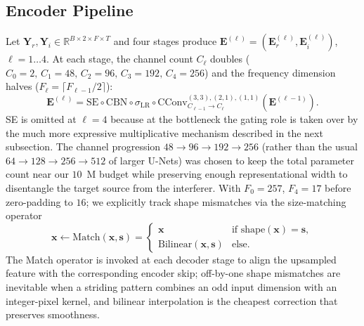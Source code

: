 \documentclass[journal,10pt]{IEEEtran}
\newcommand{\R}{\mathbb{R}}
\newcommand{\bx}{\mathbf{x}}
\newcommand{\bY}{\mathbf{Y}}
\newcommand{\bE}{\mathbf{E}}
\newcommand{\bs}{\mathbf{s}}
\begin{document}
\subsection{Encoder Pipeline}
Let \(\bY_r,\bY_i\!\in\!\R^{B\times 2\times F\times T}\) and four stages produce \(\bE^{(\ell)}=(\bE^{(\ell)}_r,\bE^{(\ell)}_i)\), \(\ell=1\!\dots\!4\). At each stage, the channel count \(C_\ell\) doubles (\(C_0\!=\!2,\,C_1\!=\!48,\,C_2\!=\!96,\,C_3\!=\!192,\,C_4\!=\!256\)) and the frequency dimension halves (\(F_\ell=\lceil F_{\ell-1}/2\rceil\)):
\begin{equation}
\bE^{(\ell)}=\mathrm{SE}\!\circ\!\mathrm{CBN}\!\circ\!\sigma_{\mathrm{LR}}\!\circ\!\mathrm{CConv}_{C_{\ell-1}\to C_\ell}^{(3,3),(2,1),(1,1)}(\bE^{(\ell-1)}).
\label{eq:encstage}
\end{equation}
SE is omitted at \(\ell=4\) because at the bottleneck the gating role is taken over by the much more expressive multiplicative mechanism described in the next subsection. The channel progression \(48 \to 96 \to 192 \to 256\) (rather than the usual \(64 \to 128 \to 256 \to 512\) of larger U-Nets) was chosen to keep the total parameter count near our \(10\)~M budget while preserving enough representational width to disentangle the target source from the interferer. With \(F_0\!=\!257\), \(F_4\!=\!17\) before zero-padding to \(16\); we explicitly track shape mismatches via the size-matching operator
\begin{equation}
\bx\leftarrow\mathrm{Match}(\bx,\bs)=\!\begin{cases}\bx&\text{if }\mathrm{shape}(\bx)=\bs,\\\mathrm{Bilinear}(\bx,\bs)&\text{else.}\end{cases}
\label{eq:match}
\end{equation}
The Match operator is invoked at each decoder stage to align the upsampled feature with the corresponding encoder skip; off-by-one shape mismatches are inevitable when a striding pattern combines an odd input dimension with an integer-pixel kernel, and bilinear interpolation is the cheapest correction that preserves smoothness.
\end{document}
